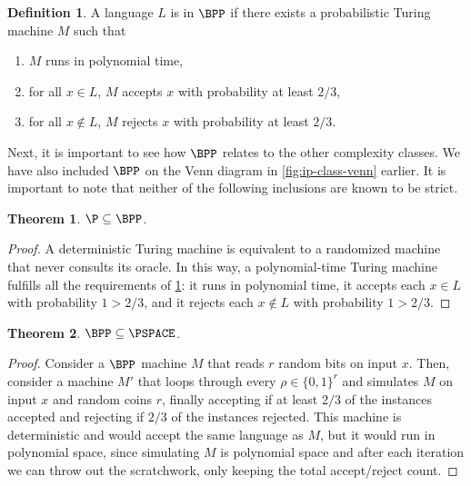 \documentclass[english,12pt]{reedthesis}
\theoremstyle{plain}
\newtheorem{thm}{Theorem}[section]
\theoremstyle{definition}
\newtheorem{defn}[defn]{Definition}
\theoremstyle{remark}
\begin{document}
\begin{defn}\label{def:bpp}
  A language $L$ is in $\BPP$ if there exists a probabilistic Turing machine $M$
  such that
  \begin{enumerate}
    \item $M$ runs in polynomial time,
    \item for all $x \in L$, $M$ accepts $x$ with probability at least $2/3$,
    \item for all $x \notin L$, $M$ rejects $x$ with probability at least $2/3$.
  \end{enumerate}
\end{defn}

Next, it is important to see how $\BPP$ relates to the other complexity classes.
We have also included $\BPP$ on the Venn diagram in \cref{fig:ip-class-venn}
earlier. It is important to note that neither of the following inclusions are
known to be strict.

\begin{thm}\label{thm:p-subset-bpp}
  $\P \subseteq \BPP$.
\end{thm}

\begin{proof}
  A deterministic Turing machine is equivalent to a randomized machine that
  never consults its oracle. In this way, a polynomial-time Turing machine
  fulfills all the requirements of \cref{def:bpp}: it runs in polynomial time,
  it accepts each $x \in L$ with probability $1 > 2/3$, and it rejects each
  $x \notin L$ with probability $1 > 2/3$.
\end{proof}

\begin{thm}\label{thm:bpp-subset-pspace}
  $\BPP \subseteq \PSPACE$.
\end{thm}

\begin{proof}
  Consider a $\BPP$ machine $M$ that reads $r$ random bits on input $x$. Then,
  consider a machine $M'$ that loops through every $\rho \in \{0, 1\}^{r}$ and
  simulates $M$ on input $x$ and random coins $r$, finally accepting if at least
  $2/3$ of the instances accepted and rejecting if $2/3$ of the instances
  rejected. This machine is deterministic and would accept the same language as
  $M$, but it would run in polynomial space, since simulating $M$ is polynomial
  space and after each iteration we can throw out the scratchwork, only keeping
  the total accept/reject count.
\end{proof}
\end{document}
